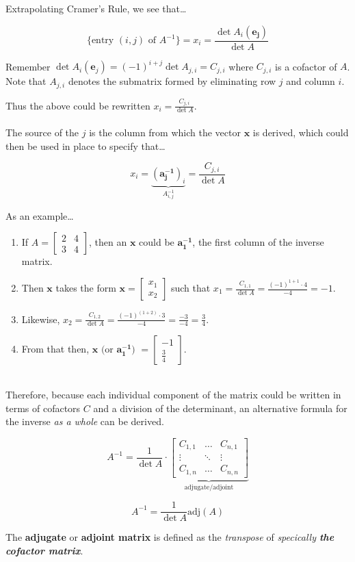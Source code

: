 \documentclass[12pt]{article}
\newcommand{\bt}[1]{\textbf{{#1}}}
\newcommand{\bm}[1]{\mathbf{{#1}}}
\newcommand{\mb}{\begin{bmatrix}}
\newcommand{\me}{\end{bmatrix}}
\newcommand{\adj}[1]{\textrm{adj$({#1})$}}
\begin{document}
Extrapolating Cramer's Rule, we see that\dots

$$\{\textrm{entry } (i,j) \textrm{ of } A^{-1}\} = x_i = \frac{\det A_i(\bm{e_j})}{\det A}$$

Remember $\det A_i (\bm{e}_j) = (-1)^{i + j} \det A_{j,i} = C_{j,i}$ where $C_{j,i}$ is a cofactor of $A$. Note that $A_{j,i}$ denotes the submatrix formed by eliminating row $j$ and column $i$.

Thus the above could be rewritten $x_i = \frac{C_{j,i}}{\det A}$. \\ \\

The source of the $j$ is the column from which the vector $\bm{x}$ is derived, which could then be used in place to specify that\dots

$$x_i = \underbrace{(\bm{a^{-1}_j})_i}_{A^{-1}_{i,j}} = \frac{C_{j,i}}{\det A}$$

As an example\dots
\begin{enumerate}
    \item If $A = \mb 2 & 4 \\ 3 & 4 \me$, then an $\bm{x}$ could be $\bm{a^{-1}_1}$, the first column of the inverse matrix.
    \item Then $\bm{x}$ takes the form $\bm{x} = \mb x_1 \\ x_2 \me$ such that $x_1 = \frac{C_{1,1}}{\det A} = \frac{(-1)^{1+1} \cdot 4}{-4} = -1$.
    \item Likewise, $x_2 = \frac{C_{1,2}}{\det A} = \frac{(-1)^{(1+2)} \cdot 3}{-4} = \frac{-3}{-4} = \frac{3}{4}$.
    \item From that then, $\bm{x} \textrm{ (or $\bm{a^{-1}_1}$) } = \mb -1 \\ \frac{3}{4} \me$. \\ \\
\end{enumerate}

Therefore, because each individual component of the matrix could be written in terms of cofactors $C$ and a division of the determinant, an
alternative formula for the inverse \emph{as a whole} can be derived.

$$A^{-1} = \frac{1}{\det A} \cdot
\underbrace{\mb
C_{1,1} & \dots & C_{n,1} \\
\vdots & \ddots & \vdots \\
C_{1,n} & \dots & C_{n,n}
\me}_{\textrm{adjugate/adjoint}}$$

$$A^{-1} = \frac{1}{\det A}\adj{A} $$

The \bt{adjugate} or \bt{adjoint matrix} is defined as the \emph{transpose} of \emph{specically \bt{the cofactor matrix}}. \\ \\
\end{document}
